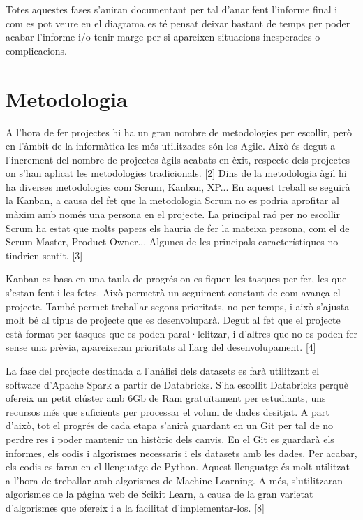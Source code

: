 \documentclass[10pt,a4paper,twocolumn,twoside]{article}
\begin{document}
Totes aquestes fases s'aniran documentant per tal d'anar fent l'informe final i com es pot veure en el diagrama es té pensat deixar bastant de temps per poder acabar l'informe i/o tenir marge per si apareixen situacions inesperades o complicacions.

\section{Metodologia}
A l'hora de fer projectes hi ha un gran nombre de metodologies per escollir, però en l'àmbit de la informàtica les més utilitzades són les Agile. Això és degut a l'increment del nombre de projectes àgils acabats en èxit, respecte dels projectes on s'han aplicat les metodologies tradicionals. [2] Dins de la metodologia àgil hi ha diverses metodologies com Scrum, Kanban, XP... En aquest treball se seguirà la Kanban, a causa del fet que la metodologia Scrum no es podria aprofitar al màxim amb només una persona en el projecte. La principal raó per no escollir Scrum ha estat que molts papers els hauria de fer la mateixa persona, com el de Scrum Master, Product Owner... Algunes de les principals característiques no tindrien sentit. [3]

Kanban es basa en una taula de progrés on es fiquen les tasques per fer, les que s'estan fent i les fetes. Això permetrà un seguiment constant de com avança el projecte. També permet treballar segons prioritats, no per temps, i això s'ajusta molt bé al tipus de projecte que es desenvoluparà. Degut al fet que el projecte està format per tasques que es poden paral·lelitzar, i d'altres que no es poden fer sense una prèvia, apareixeran prioritats al llarg del desenvolupament. [4]

La fase del projecte destinada a l'anàlisi dels datasets es farà utilitzant el software d'Apache Spark a partir de Databricks. S'ha escollit Databricks perquè ofereix un petit clúster amb 6Gb de Ram gratuïtament per estudiants, uns recursos més que suficients per processar el volum de dades desitjat.
A part d'això, tot el progrés de cada etapa s'anirà guardant en un Git per tal de no perdre res i poder mantenir un històric dels canvis. En el Git es guardarà els informes, els codis i algorismes necessaris i els datasets amb les dades.
Per acabar, els codis es faran en el llenguatge de Python. Aquest llenguatge és molt utilitzat a l'hora de treballar amb algorismes de Machine Learning. A més, s'utilitzaran algorismes de la pàgina web de Scikit Learn, a causa de la gran varietat d'algorismes que ofereix i a la facilitat d'implementar-los. [8] 
\end{document}
